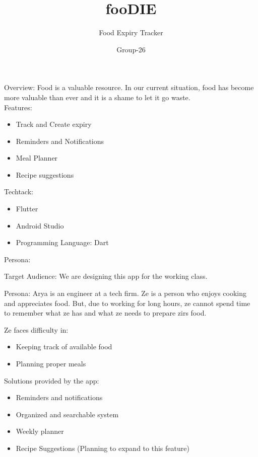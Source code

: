 \documentclass[14pt]{beamer}
\title{fooDIE}
\subtitle{Food Expiry Tracker}
\author{Group-26}
\institute{SriPriya, Yaksha, Avantika}
\date{}
\begin{document}
\maketitle

\begin{frame}{Overview: }
Food is a valuable resource. In our current situation, food has become more valuable than ever and it is a shame to let it go waste.\\
	\alert {Features: }
	\begin{itemize}
			\pause
		\item Track and Create expiry
			\pause
		\item Reminders and Notifications
			\pause
		\item Meal Planner
			\pause
		\item Recipe suggestions
	\end{itemize}
\end{frame}

\begin{frame}[standout]
\alert {Techtack: }
	\begin{itemize}
			\pause
		\item Flutter
			\pause
		\item Android Studio
			\pause
		\item Programming Language: Dart
	\end{itemize}
\end{frame}

\begin{frame}{Persona: }
	\begin{exampleblock}{Target Audience: }
		We are designing this app for the working class.
	\end{exampleblock}

	\alert{Persona: }
	Arya is an engineer at a tech firm. Ze is a person who enjoys cooking and appreciates food. But, due to working for long hours, ze cannot spend time to remember what ze has and what ze needs to prepare zirs food.  
\end{frame}

\begin{frame}
	\alert {Ze faces difficulty in: }
	\begin{itemize}
			\pause
		\item Keeping track of available food
			\pause
		\item Planning proper meals
			\pause
	\end{itemize}

	\alert {Solutions provided by the app: }
	\begin{itemize}
			\pause
		\item Reminders and notifications
			\pause
		\item Organized and searchable system
			\pause
		\item Weekly planner
			\pause
		\item Recipe Suggestions (Planning to expand to this feature)
			\pause
	\end{itemize}
\end{frame}
\end{document}
